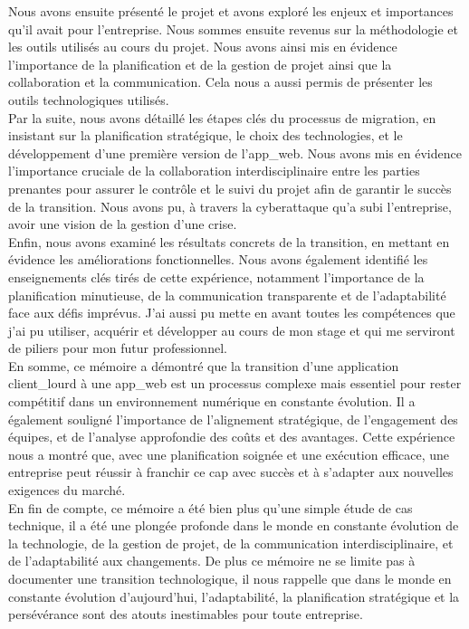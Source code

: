 \documentclass[a4paper, 12pt, french]{article}
\begin{document}
		Nous avons ensuite présenté le projet et avons exploré les enjeux et importances qu'il avait pour l'entreprise. Nous sommes ensuite revenus sur la méthodologie et les outils utilisés au cours du projet. Nous avons ainsi mis en évidence l'importance de la planification et de la gestion de projet ainsi que la collaboration et la communication. Cela nous a aussi permis de présenter les outils technologiques utilisés.\\

		Par la suite, nous avons détaillé les étapes clés du processus de migration, en insistant sur la planification stratégique, le choix des technologies, et le développement d'une première version de l'\gls{app_web}. Nous avons mis en évidence l'importance cruciale de la collaboration interdisciplinaire entre les parties prenantes pour assurer le contrôle et le suivi du projet afin de garantir le succès de la transition. Nous avons pu, à travers la cyberattaque qu'a subi l'entreprise, avoir une vision de la gestion d'une crise.\\

		Enfin, nous avons examiné les résultats concrets de la transition, en mettant en évidence les améliorations fonctionnelles. Nous avons également identifié les enseignements clés tirés de cette expérience, notamment l'importance de la planification minutieuse, de la communication transparente et de l'adaptabilité face aux défis imprévus. J'ai aussi pu mette en avant toutes les compétences que j'ai pu utiliser, acquérir et développer au cours de mon stage et qui me serviront de piliers pour mon futur professionnel.\\

		En somme, ce mémoire a démontré que la transition d'une application \gls{client_lourd} à une \gls{app_web} est un processus complexe mais essentiel pour rester compétitif dans un environnement numérique en constante évolution. Il a également souligné l'importance de l'alignement stratégique, de l'engagement des équipes, et de l'analyse approfondie des coûts et des avantages. Cette expérience nous a montré que, avec une planification soignée et une exécution efficace, une entreprise peut réussir à franchir ce cap avec succès et à s'adapter aux nouvelles exigences du marché.\\

		En fin de compte, ce mémoire a été bien plus qu'une simple étude de cas technique, il a été une plongée profonde dans le monde en constante évolution de la technologie, de la gestion de projet, de la communication interdisciplinaire, et de l'adaptabilité aux changements. De plus ce mémoire ne se limite pas à documenter une transition technologique, il nous rappelle que dans le monde en constante évolution d'aujourd'hui, l'adaptabilité, la planification stratégique et la persévérance sont des atouts inestimables pour toute entreprise.\\
\end{document}
